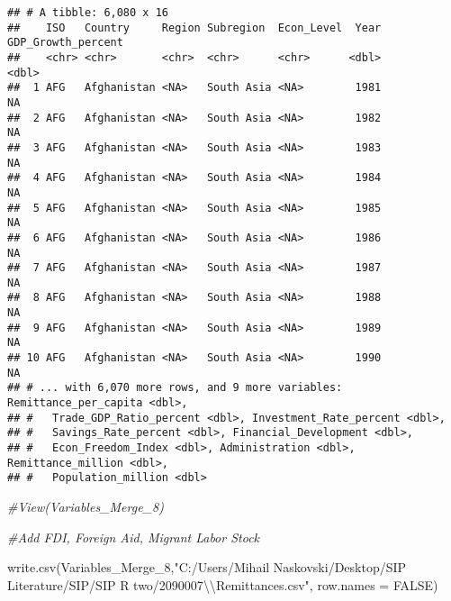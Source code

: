 \documentclass[
]{article}
\newenvironment{Shaded}{\begin{snugshade}}{\end{snugshade}}
\newcommand{\AttributeTok}[1]{\textcolor[rgb]{0.77,0.63,0.00}{#1}}
\newcommand{\CommentTok}[1]{\textcolor[rgb]{0.56,0.35,0.01}{\textit{#1}}}
\newcommand{\ConstantTok}[1]{\textcolor[rgb]{0.00,0.00,0.00}{#1}}
\newcommand{\FunctionTok}[1]{\textcolor[rgb]{0.00,0.00,0.00}{#1}}
\newcommand{\NormalTok}[1]{#1}
\newcommand{\SpecialCharTok}[1]{\textcolor[rgb]{0.00,0.00,0.00}{#1}}
\newcommand{\StringTok}[1]{\textcolor[rgb]{0.31,0.60,0.02}{#1}}
\begin{document}
\begin{verbatim}
## # A tibble: 6,080 x 16
##    ISO   Country     Region Subregion  Econ_Level  Year GDP_Growth_percent
##    <chr> <chr>       <chr>  <chr>      <chr>      <dbl>              <dbl>
##  1 AFG   Afghanistan <NA>   South Asia <NA>        1981                 NA
##  2 AFG   Afghanistan <NA>   South Asia <NA>        1982                 NA
##  3 AFG   Afghanistan <NA>   South Asia <NA>        1983                 NA
##  4 AFG   Afghanistan <NA>   South Asia <NA>        1984                 NA
##  5 AFG   Afghanistan <NA>   South Asia <NA>        1985                 NA
##  6 AFG   Afghanistan <NA>   South Asia <NA>        1986                 NA
##  7 AFG   Afghanistan <NA>   South Asia <NA>        1987                 NA
##  8 AFG   Afghanistan <NA>   South Asia <NA>        1988                 NA
##  9 AFG   Afghanistan <NA>   South Asia <NA>        1989                 NA
## 10 AFG   Afghanistan <NA>   South Asia <NA>        1990                 NA
## # ... with 6,070 more rows, and 9 more variables: Remittance_per_capita <dbl>,
## #   Trade_GDP_Ratio_percent <dbl>, Investment_Rate_percent <dbl>,
## #   Savings_Rate_percent <dbl>, Financial_Development <dbl>,
## #   Econ_Freedom_Index <dbl>, Administration <dbl>, Remittance_million <dbl>,
## #   Population_million <dbl>
\end{verbatim}

\begin{Shaded}
\begin{Highlighting}[]
\CommentTok{\#View(Variables\_Merge\_8)}


\CommentTok{\#Add FDI, Foreign Aid, Migrant Labor Stock}


\FunctionTok{write.csv}\NormalTok{(Variables\_Merge\_8,}\StringTok{"C:/Users/Mihail Naskovski/Desktop/SIP Literature/SIP/SIP R two/2090007}\SpecialCharTok{\textbackslash{}\textbackslash{}}\StringTok{Remittances.csv"}\NormalTok{, }\AttributeTok{row.names =} \ConstantTok{FALSE}\NormalTok{)}
\end{Highlighting}
\end{Shaded}
\end{document}
